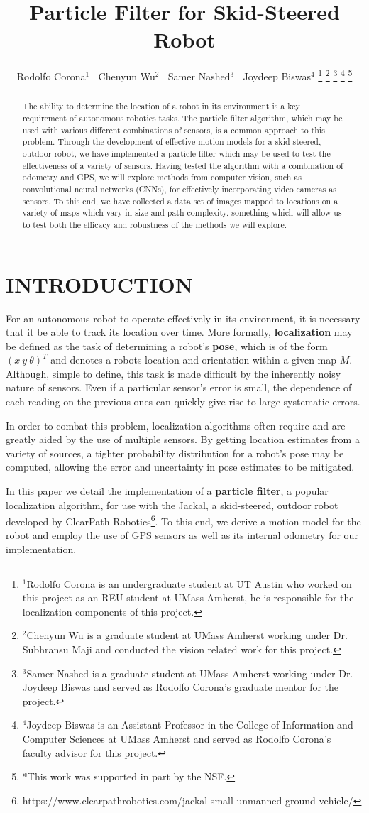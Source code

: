 \documentclass[letterpaper, 12 pt, conference]{ieeeconf}  %
\title{\LARGE \bf
Particle Filter for Skid-Steered Robot
}
\author{Rodolfo Corona$^{1}$ 
$~$ Chenyun Wu$^{2}$ $~$ Samer Nashed$^{3}$ $~$ Joydeep Biswas$^{4}$ %
\thanks{$^{1}$Rodolfo Corona is an undergraduate student at UT Austin who worked on this project as an REU student at UMass Amherst, he is responsible for the localization components of this project.}
\thanks{$^{2}$Chenyun Wu is a graduate student at UMass Amherst working under Dr. Subhransu Maji and conducted the vision related work for this project.}
\thanks{$^{3}$Samer Nashed is a graduate student at UMass Amherst working under Dr. Joydeep Biswas and served as Rodolfo Corona's graduate mentor for the project.}
\thanks{$^{4}$Joydeep Biswas is an Assistant Professor in the College of Information and Computer Sciences at UMass Amherst and served as Rodolfo Corona's faculty advisor for this project.} 
\thanks{*This work was supported in part by the NSF.}
}
\begin{document}
\maketitle
\thispagestyle{empty}
\pagestyle{empty}


\begin{abstract}

The ability to determine the location of a robot in its environment is a key requirement of autonomous robotics tasks. The particle filter algorithm, which may be used with various different combinations of sensors, is a common approach to this problem. Through the development of effective motion models for a skid-steered, outdoor robot, we have implemented a particle filter which may be used to test the effectiveness of a variety of sensors. Having tested the algorithm with a combination of odometry and GPS, we will explore methods from computer vision, such as convolutional neural networks (CNNs), for effectively incorporating video cameras as sensors. To this end, we have collected a data set of images mapped to locations on a variety of maps which vary in size and path complexity, something which will allow us to test both the efficacy and robustness of the methods we will explore.

\end{abstract}


\section{INTRODUCTION}
For an autonomous robot to operate effectively in its environment, it is necessary that it be able to track its location over time. More formally, \textbf{localization} may be defined as the task of determining a robot's \textbf{pose}, which is of the form $(x~y~\theta)^T$ and denotes a robots location and orientation within a given map $M$. Although, simple to define, this task is made difficult by the inherently noisy nature of sensors. Even if a particular sensor's error is small, the dependence of each reading on the previous ones can quickly give rise to large systematic errors.  
\par
In order to combat this problem, localization algorithms often require and are greatly aided by the use of multiple sensors. By getting location estimates from a variety of sources, a tighter probability distribution for a robot's pose may be computed, allowing the error and uncertainty in pose estimates to be mitigated. 
\par
In this paper we detail the implementation of a \textbf{particle filter}, a popular localization algorithm, for use with the Jackal, a skid-steered, outdoor robot developed by ClearPath Robotics\footnote{https://www.clearpathrobotics.com/jackal-small-unmanned-ground-vehicle/}. To this end, we derive a motion model for the robot and employ the use of GPS sensors as well as its internal odometry for our implementation.
\end{document}
